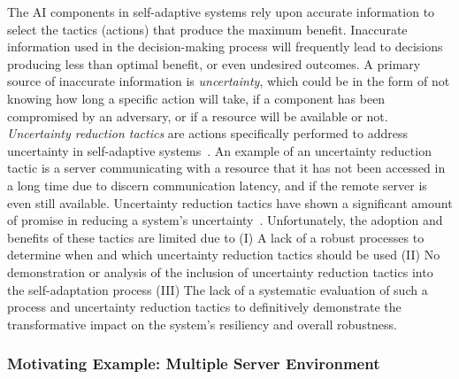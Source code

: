 \documentclass[12pt]{article}
\newcommand{\dan}[1]{\textcolor{blue}{{\it [Dan says: #1]}}}
\begin{document}
The AI components in self-adaptive systems rely upon accurate information to select the tactics (actions) that produce the maximum benefit. Inaccurate information used in the decision-making process will frequently lead to decisions producing less than optimal benefit, or even undesired outcomes. A primary source of inaccurate information is \emph{uncertainty}, which could be in the form of not knowing how long a specific action will take, if a component has been compromised by an adversary, or if a resource will be available or not. \emph{Uncertainty reduction tactics} are actions specifically performed to address uncertainty in self-adaptive systems~\cite{camara2017uncertainty, moreno2018uncertainty}. An example of an uncertainty reduction tactic is a server communicating with a resource that it has not been accessed in a long time due to discern communication latency, and if the remote server is even still available. Uncertainty reduction tactics have shown a significant amount of promise in reducing a system's uncertainty~\cite{moreno2018uncertainty,esfahani2013uncertainty,mahdavi2016classification,Ramirez:2012:TUD:2666795.2666812}. Unfortunately, the adoption and benefits of these tactics are limited due to (I) A lack of a robust processes to determine when and which uncertainty reduction tactics should be used (II) No demonstration or analysis of the inclusion of uncertainty reduction tactics into the self-adaptation process (III) The lack of a systematic evaluation of such a process and uncertainty reduction tactics to definitively demonstrate the transformative impact on the system's resiliency and overall robustness. 

% 




\subsubsection{Motivating Example: Multiple Server Environment} %


\end{document}
